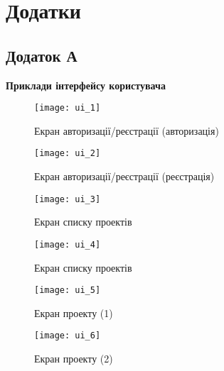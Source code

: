 \setcounter{chapter}{1}
\renewcommand\thechapter{\Alph{chapter}}

\chapter*{Додатки}

\centeredsection



\section*{Додаток А}
\begin{center}
	\bfseries Приклади інтерфейсу користувача
\end{center}

\begin{figure}[H]
	\centering
	\texttt{[image: ui\_1]}
	\caption{Екран авторизації/реєстрації (авторизація)}
	\label{scr_ui_auth}
\end{figure}

\begin{figure}[H]
	\centering
	\texttt{[image: ui\_2]}
	\caption{Екран авторизації/реєстрації (реєстрація)}
	\label{scr_ui_signup}
\end{figure}

\begin{figure}[H]
	\centering
	\texttt{[image: ui\_3]}
	\caption{Екран списку проектів}
	\label{scr_ui_projects_list}
\end{figure}

\begin{figure}[H]
	\centering
	\texttt{[image: ui\_4]}
	\caption{Екран списку проектів}
	\label{scr_ui_project_creation}
\end{figure}

\begin{figure}[H]
	\centering
	\texttt{[image: ui\_5]}
	\caption{Екран проекту (1)}
	\label{scr_ui_project_1}
\end{figure}

\begin{figure}[H]
	\centering
	\texttt{[image: ui\_6]}
	\caption{Екран проекту (2)}
	\label{scr_ui_project_2}
\end{figure}

